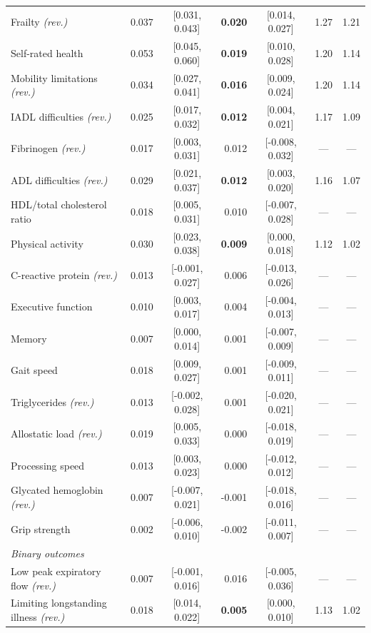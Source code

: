\begin{longtable}{lrcrccc}
Frailty \textit{(rev.)} & 0.037 & [0.031, 0.043] & \textbf{0.020} & [0.014, 0.027] & 1.27 & 1.21 \\
Self-rated health & 0.053 & [0.045, 0.060] & \textbf{0.019} & [0.010, 0.028] & 1.20 & 1.14 \\
Mobility limitations \textit{(rev.)} & 0.034 & [0.027, 0.041] & \textbf{0.016} & [0.009, 0.024] & 1.20 & 1.14 \\
IADL difficulties \textit{(rev.)} & 0.025 & [0.017, 0.032] & \textbf{0.012} & [0.004, 0.021] & 1.17 & 1.09 \\
Fibrinogen \textit{(rev.)} & 0.017 & [0.003, 0.031] & 0.012 & [-0.008, 0.032] & --- & --- \\
ADL difficulties \textit{(rev.)} & 0.029 & [0.021, 0.037] & \textbf{0.012} & [0.003, 0.020] & 1.16 & 1.07 \\
HDL/total cholesterol ratio & 0.018 & [0.005, 0.031] & 0.010 & [-0.007, 0.028] & --- & --- \\
Physical activity & 0.030 & [0.023, 0.038] & \textbf{0.009} & [0.000, 0.018] & 1.12 & 1.02 \\
C-reactive protein \textit{(rev.)} & 0.013 & [-0.001, 0.027] & 0.006 & [-0.013, 0.026] & --- & --- \\
Executive function & 0.010 & [0.003, 0.017] & 0.004 & [-0.004, 0.013] & --- & --- \\
Memory & 0.007 & [0.000, 0.014] & 0.001 & [-0.007, 0.009] & --- & --- \\
Gait speed & 0.018 & [0.009, 0.027] & 0.001 & [-0.009, 0.011] & --- & --- \\
Triglycerides \textit{(rev.)} & 0.013 & [-0.002, 0.028] & 0.001 & [-0.020, 0.021] & --- & --- \\
Allostatic load \textit{(rev.)} & 0.019 & [0.005, 0.033] & 0.000 & [-0.018, 0.019] & --- & --- \\
Processing speed & 0.013 & [0.003, 0.023] & 0.000 & [-0.012, 0.012] & --- & --- \\
Glycated hemoglobin \textit{(rev.)} & 0.007 & [-0.007, 0.021] & -0.001 & [-0.018, 0.016] & --- & --- \\
Grip strength & 0.002 & [-0.006, 0.010] & -0.002 & [-0.011, 0.007] & --- & --- \\
\midrule
\multicolumn{7}{l}{\emph{Binary outcomes}} \\
\midrule
Low peak expiratory flow \textit{(rev.)} & 0.007 & [-0.001, 0.016] & 0.016 & [-0.005, 0.036] & --- & --- \\
Limiting longstanding illness \textit{(rev.)} & 0.018 & [0.014, 0.022] & \textbf{0.005} & [0.000, 0.010] & 1.13 & 1.02 \\

\end{longtable}
